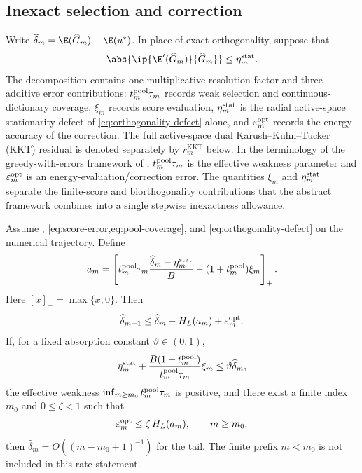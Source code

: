 \subsection{Inexact selection and correction}

Write \(\widehat\delta_m=\E(\widehat G_m)-\E(u^*)\). In place of exact orthogonality, suppose that
\begin{equation}
  \abs{\ip{\E'(\widehat G_m)}{\widehat G_m}}\leq\eta_m^{\rm stat}.
  \label{eq:orthogonality-defect}
\end{equation}
The decomposition contains one multiplicative resolution factor and three additive error
contributions: \(t_m^{\rm pool}\tau_m\) records weak selection and continuous-dictionary coverage,
\(\xi_m\) records score evaluation, \(\eta_m^{\rm stat}\) is the radial active-space stationarity
defect of \cref{eq:orthogonality-defect} alone, and \(\varepsilon_m^{\rm opt}\) records the energy
accuracy of the correction. The full active-space dual Karush--Kuhn--Tucker (KKT) residual is
denoted separately by \(r_m^{\mathrm{KKT}}\) below. In the terminology of the greedy-with-errors
framework of \cite[Section~3]{DereventsovTemlyakov2022}, \(t_m^{\rm pool}\tau_m\) is the effective
weakness parameter and \(\varepsilon_m^{\rm opt}\) is an energy-evaluation/correction error. The
quantities \(\xi_m\) and \(\eta_m^{\rm stat}\) separate the finite-score and biorthogonality
contributions that the abstract framework combines into a single stepwise inexactness allowance.

\begin{theorem}
\label{thm:inexact}
Assume , \cref{eq:score-error,eq:pool-coverage}, and
\cref{eq:orthogonality-defect} on the numerical trajectory. Define
\[
 a_m=\left[
 t_m^{\rm pool}\tau_m\frac{\widehat\delta_m-\eta_m^{\rm stat}}{B}
 -(1+t_m^{\rm pool})\xi_m
 \right]_+.
\]
Here \([x]_+=\max\{x,0\}\).
Then
\begin{equation}
 \widehat\delta_{m+1}\leq\widehat\delta_m-H_L(a_m)+\varepsilon_m^{\rm opt}.
 \label{eq:inexact-descent}
\end{equation}
If, for a fixed absorption constant \(\vartheta\in(0,1)\),
\begin{equation}
 \eta_m^{\rm stat}+\frac{B(1+t_m^{\rm pool})}{t_m^{\rm pool}\tau_m}\xi_m
 \leq\vartheta\widehat\delta_m,
 \label{eq:relative-defect}
\end{equation}
the effective weakness \(\inf_{m\ge m_0} t_m^{\rm pool}\tau_m\) is positive, and there
exist a finite index \(m_0\) and \(0\leq\zeta<1\) such that
\[
  \varepsilon_m^{\rm opt}\leq\zeta\,H_L(a_m),\qquad m\ge m_0,
\]
then \(\widehat\delta_m=O((m-m_0+1)^{-1})\) for the tail. The finite prefix
\(m<m_0\) is not included in this rate statement.
\end{theorem}

